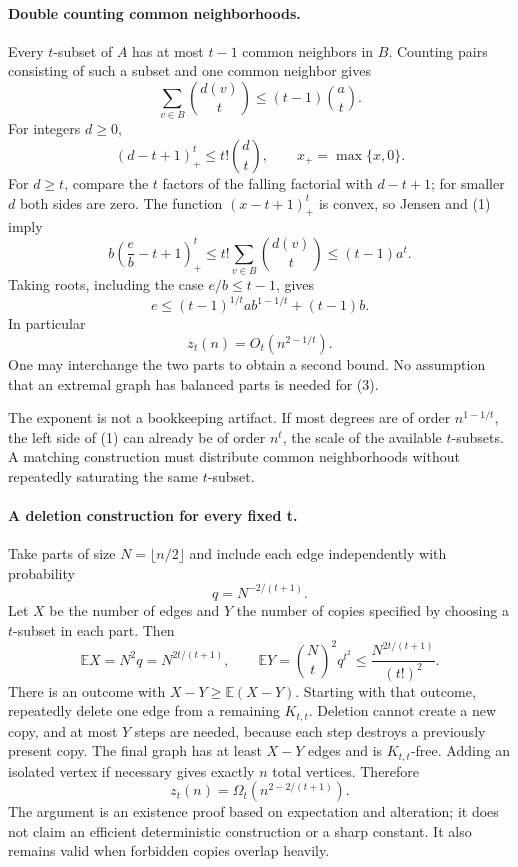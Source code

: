 \documentclass[11pt]{article}
\begin{document}
\paragraph{Double counting common neighborhoods.}
Every $t$-subset of $A$ has at most $t-1$ common neighbors in $B$.
Counting pairs consisting of such a subset and one common neighbor gives
\[
                  \sum_{v\in B}\binom{d(v)}t
                        \le(t-1)\binom at.              \tag{1}
\]
For integers $d\ge0$,
\[
              (d-t+1)_+^t\le t!\binom dt,
 \qquad x_+=\max\{x,0\}.
\]
For $d\ge t$, compare the $t$ factors of the falling factorial with
$d-t+1$; for smaller $d$ both sides are zero. The function
$(x-t+1)_+^t$ is convex, so Jensen and (1) imply
\[
 b\left(\frac eb-t+1\right)_+^t
       \le t!\sum_{v\in B}\binom{d(v)}t
       \le(t-1)a^t.
\]
Taking roots, including the case $e/b\le t-1$, gives
\[
              e\le(t-1)^{1/t}a b^{1-1/t}+(t-1)b.        \tag{2}
\]
In particular
\[
                            z_t(n)=O_t(n^{2-1/t}).       \tag{3}
\]
One may interchange the two parts to obtain a second bound. No
assumption that an extremal graph has balanced parts is needed for (3).

The exponent is not a bookkeeping artifact. If most degrees are of
order $n^{1-1/t}$, the left side of (1) can already be of order $n^t$,
the scale of the available $t$-subsets. A matching construction must
distribute common neighborhoods without repeatedly saturating the
same $t$-subset.

\paragraph{A deletion construction for every fixed t.}
Take parts of size $N=\lfloor n/2\rfloor$ and include each edge
independently with probability
\[
                            q=N^{-2/(t+1)}.
\]
Let $X$ be the number of edges and $Y$ the number of copies specified
by choosing a $t$-subset in each part. Then
\[
 \mathbb EX=N^2q=N^{2t/(t+1)},\qquad
 \mathbb EY=\binom Nt^2q^{t^2}
       \le\frac{N^{2t/(t+1)}}{(t!)^2}.                  \tag{4}
\]
There is an outcome with $X-Y\ge\mathbb E(X-Y)$.
Starting with that outcome, repeatedly delete one edge from a remaining
$K_{t,t}$. Deletion cannot create a new copy, and at most $Y$ steps
are needed, because each step destroys a previously present copy.
The final graph has at least $X-Y$ edges and is $K_{t,t}$-free.
Adding an isolated vertex if necessary gives exactly $n$ total vertices.
Therefore
\[
                         z_t(n)=\Omega_t(n^{2-2/(t+1)}). \tag{5}
\]
The argument is an existence proof based on expectation and alteration;
it does not claim an efficient deterministic construction or a sharp
constant. It also remains valid when forbidden copies overlap heavily.
\end{document}
